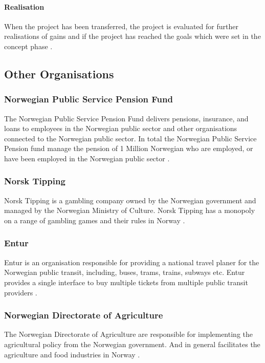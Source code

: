 \paragraph{Realisation}
When the project has been transferred, the project is evaluated for further realisations of gains and if the project has reached the goals which were set in the concept phase \cite{project_wizard_digdir_2023}.

\subsection{Other Organisations}
\subsubsection{Norwegian Public Service Pension Fund}
The Norwegian Public Service Pension Fund delivers pensions, insurance, and loans to employees in the Norwegian public sector and other organisations connected to the Norwegian public sector. In total the Norwegian Public Service Pension fund manage the pension of 1 Million Norwegian who are employed, or have been employed in the Norwegian public sector \cite{statens_pensjonskasse_2023}.

\subsubsection{Norsk Tipping}
Norsk Tipping is a gambling company owned by the Norwegian government and managed by the Norwegian Ministry of Culture. Norsk Tipping has a monopoly on a range of gambling games and their rules in Norway \cite{norsk_tipping_wiki_2023}.

\subsubsection{Entur}
Entur is an organisation responsible for providing a national travel planer for the Norwegian public transit, including, buses, trams, trains, subways etc. Entur provides a single interface to buy multiple tickets from multiple public transit providers \cite{entur_2023}.

\subsubsection{Norwegian Directorate of Agriculture}
The Norwegian Directorate of Agriculture are responsible for implementing the agricultural policy from the Norwegian government. And in general facilitates the agriculture and food industries in Norway \cite{landbruksdirektoratet_2023}.

